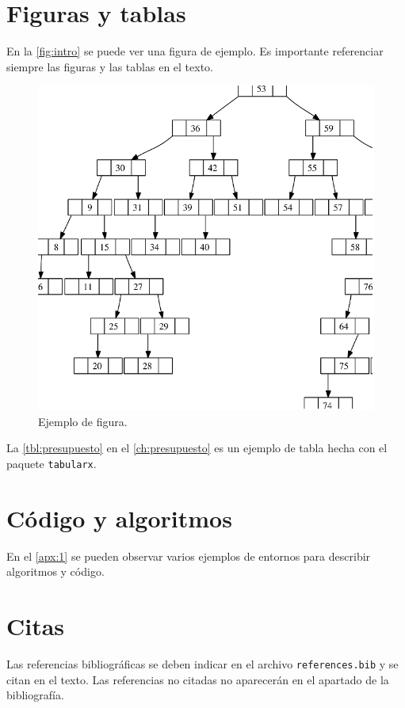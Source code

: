 \section{Figuras y tablas}

\noindent En la \autoref{fig:intro} se puede ver una figura de ejemplo. Es importante referenciar siempre las figuras y las tablas en el texto.

\begin{figure}[htb]
   \centering
   \includegraphics[width=0.8\linewidth]{images/figura_1}
   \caption{Ejemplo de figura.}
   \label{fig:intro}
\end{figure}

La \autoref{tbl:presupuesto} en el \autoref{ch:presupuesto} es un ejemplo de tabla hecha con el paquete \texttt{tabularx}.

\section{Código y algoritmos}

\noindent En el \autoref{apx:1} se pueden observar varios ejemplos de entornos para describir algoritmos y código.

\section{Citas}

\noindent Las referencias bibliográficas se deben indicar en el archivo \texttt{references.bib} y se citan en el texto. Las referencias no citadas no aparecerán en el apartado de la bibliografía.

